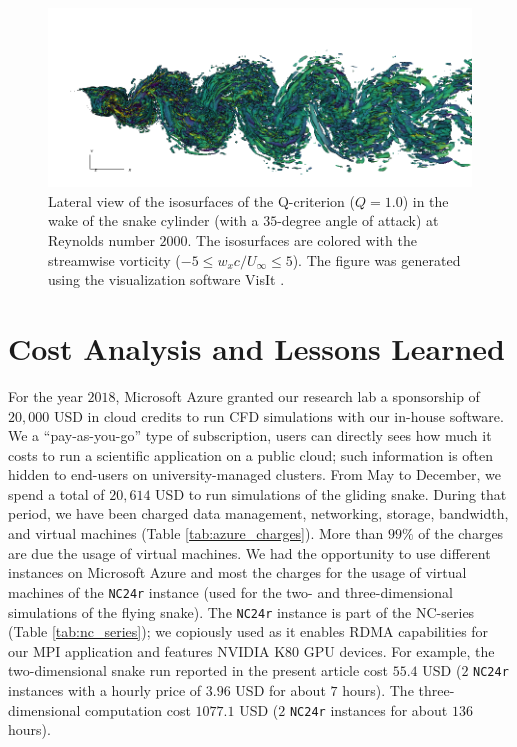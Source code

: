 \documentclass[10pt,journal,compsoc]{IEEEtran}
\begin{document}
\begin{figure}[!h]
    \centering
    \includegraphics[width=16cm]{figures/qcrit_wx_wake3d_0001.png}
    \caption{Lateral view of the isosurfaces of the Q-criterion ($Q = 1.0$) in the wake of the snake cylinder (with a $35$-degree angle of attack) at Reynolds number $2000$. The isosurfaces are colored with the streamwise vorticity ($-5 \leq w_x c / U_\infty \leq 5$). The figure was generated using the visualization software VisIt \cite{childs_et_al_2012}.}
    \label{fig:qcrit_wx_3d}
\end{figure}

\section{Cost Analysis and Lessons Learned}\label{sec:cost}


For the year $2018$, Microsoft Azure granted our research lab a sponsorship of $20,000$ USD in cloud credits to run CFD simulations with our in-house software.
We a ``pay-as-you-go'' type of subscription, users can directly sees how much it costs to run a scientific application on a public cloud; such information is often hidden to end-users on university-managed clusters.
From May to December, we spend a total of $20,614$ USD to run simulations of the gliding snake.
During that period, we have been charged data management, networking, storage, bandwidth, and virtual machines (Table \ref{tab:azure_charges}).
More than $99\%$ of the charges are due the usage of virtual machines.
We had the opportunity to use different instances on Microsoft Azure and most the charges for the usage of virtual machines of the \texttt{NC24r} instance (used for the two- and three-dimensional simulations of the flying snake).
The \texttt{NC24r} instance is part of the NC-series (Table \ref{tab:nc_series}); we copiously used as it enables RDMA capabilities for our MPI application and features NVIDIA K80 GPU devices.
For example, the two-dimensional snake run reported in the present article cost $55.4$ USD ($2$ \texttt{NC24r} instances with a hourly price of $3.96$ USD for about $7$ hours).
The three-dimensional computation cost $1077.1$ USD ($2$ \texttt{NC24r} instances for about $136$ hours).
\end{document}
